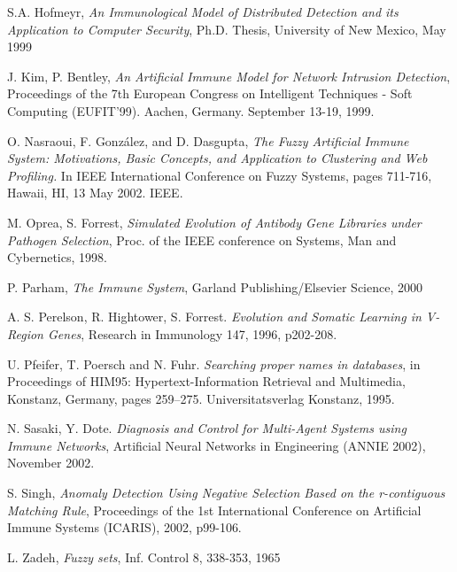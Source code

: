 \documentclass{llncs}
\begin{document}
\begin{thebibliography}{99}
S.A. Hofmeyr, {\it An Immunological Model of Distributed Detection and its Application to Computer Security}, Ph.D. Thesis, University of New Mexico, May 1999

J. Kim, P. Bentley, {\it An Artificial Immune Model for Network Intrusion Detection}, Proceedings of the 7th European Congress on Intelligent Techniques - Soft Computing (EUFIT'99). Aachen, Germany. September 13-19, 1999.

O. Nasraoui, F. Gonz\'{a}lez, and D. Dasgupta, {\it The Fuzzy Artificial Immune System: Motivations, Basic Concepts, and Application to Clustering and Web Profiling.} In IEEE International Conference on Fuzzy Systems, pages 711-716, Hawaii, HI, 13 May 2002. IEEE. 

M. Oprea, S. Forrest, {\it Simulated Evolution of Antibody Gene Libraries under Pathogen Selection}, Proc. of the IEEE conference on Systems, Man and Cybernetics, 1998.

P. Parham, {\it The Immune System}, Garland Publishing/Elsevier Science, 2000

A. S. Perelson, R. Hightower, S. Forrest. {\it Evolution and Somatic Learning in V-Region Genes}, Research in Immunology 147, 1996, p202-208.

U. Pfeifer, T. Poersch and N. Fuhr. {\it Searching proper names in databases}, in Proceedings of HIM95: Hypertext-Information Retrieval and Multimedia, Konstanz, Germany, pages 259--275. Universitatsverlag Konstanz, 1995.

N. Sasaki, Y. Dote. {\it Diagnosis and Control for Multi-Agent Systems using Immune Networks}, Artificial Neural Networks in Engineering (ANNIE 2002), November 2002.

S. Singh, {\it Anomaly Detection Using Negative Selection Based on the r-contiguous Matching Rule}, Proceedings of the 1st International Conference on Artificial Immune Systems (ICARIS), 2002, p99-106.

L. Zadeh, {\it Fuzzy sets}, Inf. Control 8, 338-353, 1965

\end{thebibliography}
\end{document}
